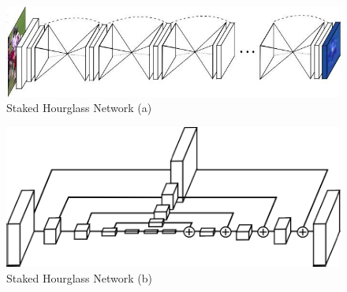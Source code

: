 \begin{minipage}{.5\linewidth}
    \begin{figure}[H]
        \centering
        \includegraphics[width=0.95\linewidth]{images/staked-hourglass}
        \caption[Staked Hourglass Network (a)]{Staked Hourglass Network (a)}
        \label{fig:pe-stacked-hourglass}
    \end{figure}
\end{minipage}
\begin{minipage}{.5\linewidth}
    \begin{figure}[H]
        \centering
        \includegraphics[width=0.95\linewidth]{images/staked-hourglass1}
        \caption[Staked Hourglass Network (b)]{Staked Hourglass Network (b)}
        \label{fig:pe-stacked-hourglass1}
    \end{figure}
\end{minipage}

